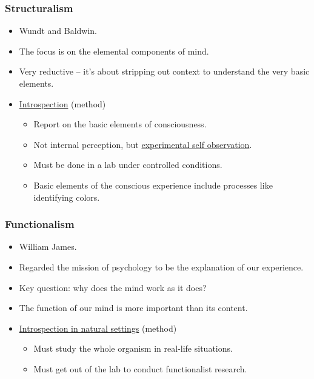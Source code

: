 \documentclass[]{article}
\begin{document}
			\subsubsection{Structuralism}
				\begin{itemize}
					\item Wundt and Baldwin.
					\item The focus is on the elemental components of mind.
					\item Very reductive -- it's about stripping out context to understand the very basic elements.

					\item \underline{Introspection} (method)
						\begin{itemize}
							\item Report on the basic elements of consciousness.
							\item Not internal perception, but \underline{experimental self observation}.
							\item Must be done in a lab under controlled conditions.
							\item Basic elements of the conscious experience include processes like identifying colors.
						\end{itemize}
				\end{itemize}

			\subsubsection{Functionalism}
				\begin{itemize}
					\item William James.
					\item Regarded the mission of psychology to be the explanation of our experience.
					\item Key question: why does the mind work as it does?
					\item The function of our mind is more important than its content.
					\item \underline{Introspection in natural settings} (method)
						\begin{itemize}
							\item Must study the whole organism in real-life situations.
							\item Must get out of the lab to conduct functionalist research.
						\end{itemize}
				\end{itemize}
\end{document}
